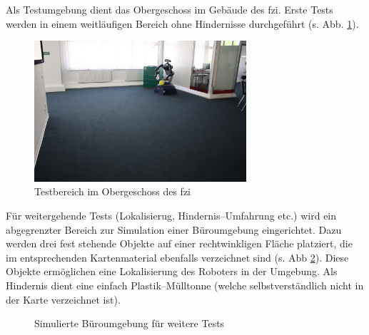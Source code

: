 Als Testumgebung dient das Obergeschoss im Gebäude des \gls{fzi}.
Erste Tests werden in einem weitläufigen Bereich ohne Hindernisse durchgeführt (s. Abb. \ref{fig:fzi_og}).
\begin{figure}
	\centering
	\includegraphics[width=0.7\textwidth]{graphics/fzi_og}
	\caption{Testbereich im Obergeschoss des \protect\gls{fzi}}
	\label{fig:fzi_og}
\end{figure}

Für weitergehende Tests (Lokalisierug, Hindernis--Umfahrung etc.) wird ein abgegrenzter Bereich zur Simulation einer Büroumgebung eingerichtet.
Dazu werden drei fest stehende Objekte auf einer rechtwinkligen Fläche platziert, die im entsprechenden Kartenmaterial ebenfalls verzeichnet sind (s. Abb \ref{fig:map_fzi}).
Diese Objekte ermöglichen eine Lokalisierung des Roboters in der Umgebung.
Als Hindernis dient eine einfach Plastik--Mülltonne (welche selbstverständlich nicht in der Karte verzeichnet ist).

\begin{figure}[h]
  \centering
  \quad %
  \caption{Simulierte Büroumgebung für weitere Tests}
  \label{fig:map_fzi}
\end{figure}

